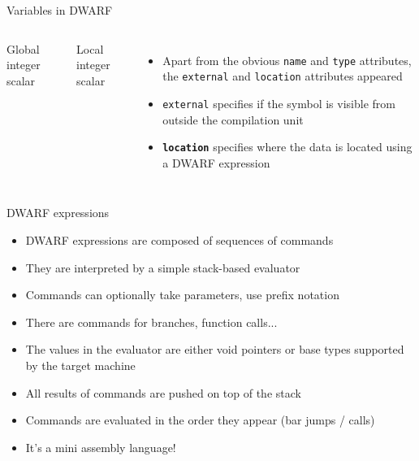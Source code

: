 \begin{frame}{Variables in DWARF}
\begin{columns}

\begin{block}{Global integer scalar}
\end{block}
\begin{block}{Local integer scalar}
\end{block}

\begin{itemize}
\item Apart from the obvious \texttt{name} and \texttt{type} attributes,
the \texttt{external} and \texttt{location} attributes appeared
\item \texttt{external} specifies if the symbol is visible from outside the compilation unit
\item \texttt{\textbf{location}} specifies where the data is located using a \alert{DWARF expression}
\end{itemize}

\end{columns}
\end{frame}


\begin{frame}{DWARF expressions}
\begin{itemize}
\item DWARF expressions are composed of \alert{sequences of commands}
\item They are interpreted by a simple \alert{stack-based evaluator}
\smallskip
\item Commands can optionally take parameters, use \alert{prefix notation}
\item There are commands for branches, function calls...
\item The values in the evaluator are either \alert{void pointers} or \alert{base types} supported by the target machine
\item All results of commands are pushed on top of the stack
\smallskip
\item Commands are evaluated in the order they appear (bar jumps / calls)
\item It's a mini assembly language!
\end{itemize}
\end{frame}


